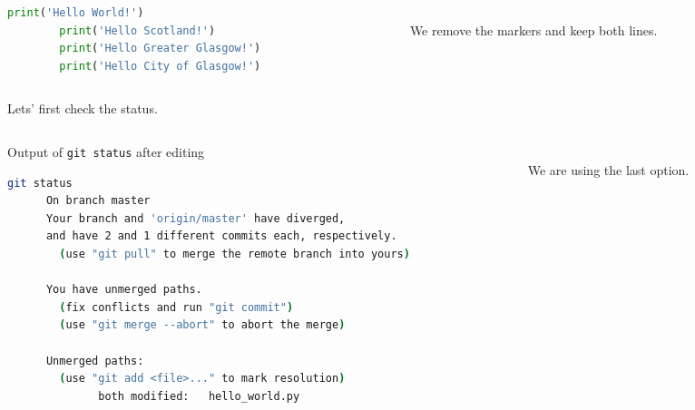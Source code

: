 \begin{frame}[fragile]
\emptyframetitle

  \vspace*{-0.5cm}
  \begin{columns}
    \begin{column}{0.59\textwidth}
      \begin{lstlisting}[language=python, basicstyle=\small\ttfamily]
        print('Hello World!')
        print('Hello Scotland!')
        print('Hello Greater Glasgow!')
        print('Hello City of Glasgow!')
      \end{lstlisting}
    \end{column}
    \begin{column}{0.41\textwidth}
      \vspace*{0.5cm}\\
      We remove the markers and keep both lines.
    \end{column}
  \end{columns}

  Lets' first check the status.
  \vspace*{-0.25cm}

 \begin{columns}
    \begin{column}{0.59\textwidth}
      \begin{block}{Output of \texttt{git status} after editing}
        \begin{lstlisting}[language=bash, basicstyle=\tiny\ttfamily]
      git status
      On branch master
      Your branch and 'origin/master' have diverged,
      and have 2 and 1 different commits each, respectively.
        (use "git pull" to merge the remote branch into yours)

      You have unmerged paths.
        (fix conflicts and run "git commit")
        (use "git merge --abort" to abort the merge)

      Unmerged paths:
        (use "git add <file>..." to mark resolution)
              both modified:   hello_world.py
        \end{lstlisting}
      \end{block}
    \end{column}
    \begin{column}{0.41\textwidth}
      \vspace*{3.5cm}\\
      We are using the last option.
    \end{column}
  \end{columns}

\end{frame}

